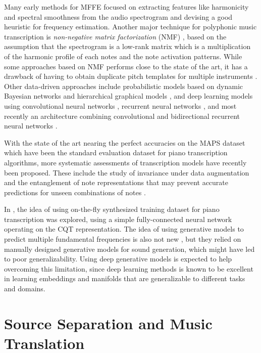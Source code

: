 Many early methods for MFFE \cite{klapuri2003multiple} focused on extracting features like harmonicity and spectral smoothness from the audio spectrogram and devising a good heuristic for frequency estimation.
Another major technique for polyphonic music transcription is \emph{non-negative matrix factorization} (NMF) \cite{lee2001nmf}, based on the assumption that the spectrogram is a low-rank matrix which is a multiplication of the harmonic profile of each notes and the note activation patterns.
While some approaches \cite{gao2017nmf} based on NMF performs close to the state of the art, it has a drawback of having to obtain duplicate pitch templates for multiple instruments \cite{bertin2010nmf}.
Other data-driven approaches include probabilistic models based on dynamic Bayesian networks \cite{raczynski2013dynamic} and hierarchical graphical models \cite{pesek2017hierarchical}, and deep learning models using convolutional neural networks \cite{bittner2017deepsalience}, recurrent neural networks \cite{bock2012rnn,sigtia2016endtoend}, and most recently an architecture combining convolutional and bidirectional recurrent neural networks \cite{hawthorne2018piano}.

With the state of the art nearing the perfect accuracies \cite{ewert2017transcription} on the MAPS dataset \cite{emiya2010multipitch} which have been the standard evaluation dataset for piano transcription algorithms, more systematic assessments of transcription models have recently been proposed.
These include the study of invariance under data augmentation \cite{thickstun2017invariances} and the entanglement of note representations that may prevent accurate predictions for unseen combinations of notes \cite{kelz2017entanglement}.

In \cite{li2017infinite}, the idea of using on-the-fly synthesized training dataset for piano transcription was explored, using a simple fully-connected neural network operating on the CQT representation.
The idea of using generative models to predict multiple fundamental frequencies is also not new \cite{dubois2005harmonic,cemgil2006generative}, but they relied on manually designed generative models for sound generation, which might have led to poor generalizability.
Using deep generative models is expected to help overcoming this limitation, since deep learning methods is known to be excellent in learning embeddings and manifolds that are generalizable to different tasks and domains.


\section{Source Separation and Music Translation}\label{sec:separation}


